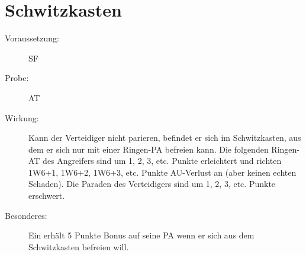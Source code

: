 \section{Schwitzkasten}
\label{uAT.schwitzkasten}
\begin{description}
    \item[Voraussetzung:]
        SF 
    \item[Probe:]
        AT
    \item[Wirkung:]
        Kann der Verteidiger nicht parieren, befindet er sich im Schwitzkasten, aus dem er sich nur mit einer Ringen-PA befreien kann.
        Die folgenden Ringen-AT des Angreifers sind um 1, 2, 3, etc. Punkte erleichtert und richten 1W6+1, 1W6+2, 1W6+3, etc. Punkte AU-Verlust an (aber keinen echten Schaden).
        Die Paraden des Verteidigers sind um 1, 2, 3, etc. Punkte erschwert.
    \item[Besonderes:]
        Ein  erhält 5 Punkte Bonus auf seine PA wenn er sich aus dem Schwitzkasten befreien will.
\end{description}
